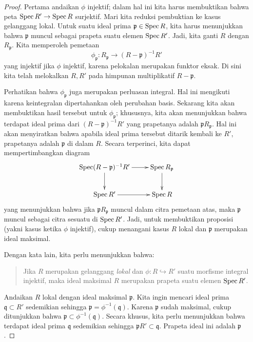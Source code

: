 \begin{proof} Pertama andaikan $\phi$ injektif; dalam hal ini kita harus membuktikan bahwa
peta $\operatorname{Spec} R' \to \operatorname{Spec} R$ surjektif.
Mari kita reduksi pembuktian ke kasus gelanggang lokal.
Untuk suatu ideal prima $\mathfrak{p} \in \operatorname{Spec} R$, kita harus menunjukkan bahwa $\mathfrak{p}$
muncul sebagai prapeta suatu elemen $\operatorname{Spec} R'$.
Jadi, kita ganti $R$ dengan $R_{\mathfrak{p}}$. Kita memperoleh pemetaan
\[ \phi_{\mathfrak{p}}: R_{\mathfrak{p}} \to (R- \mathfrak{p})^{-1} R'  \]
yang injektif jika $\phi$ injektif, karena pelokalan merupakan funktor eksak. Di sini
kita
telah melokalkan $R, R'$ pada himpunan multiplikatif $R - \mathfrak{p}$.

Perhatikan bahwa $\phi_{\mathfrak{p}}$ juga merupakan perluasan integral. Hal ini mengikuti
karena keintegralan dipertahankan oleh perubahan basis.
Sekarang kita akan membuktikan hasil tersebut untuk $\phi_{\mathfrak{p}}$; khususnya, kita
akan menunjukkan
bahwa terdapat ideal prima dari $(R- \mathfrak{p})^{-1} R'$ yang prapetanya adalah
$\mathfrak{p}R_{\mathfrak{p}}$. Hal ini akan menyiratkan bahwa apabila ideal prima tersebut
ditarik kembali ke $R'$, prapetanya adalah $\mathfrak{p}$ di dalam $R$. Secara terperinci, kita
dapat mempertimbangkan diagram
\[ \xymatrix{
\spec (R-\mathfrak{p})^{-1} R'\ar[d]  \ar[r] & \spec R_{\mathfrak{p}} \ar[d] \\
\spec R' \ar[r] &  \spec R
}\]
yang menunjukkan bahwa jika $\mathfrak{p} R_{\mathfrak{p}}$ muncul dalam citra pemetaan atas, maka
$\mathfrak{p}$
muncul sebagai citra sesuatu di $\operatorname{Spec} R'$.
Jadi, untuk membuktikan proposisi (yakni kasus ketika $\phi$
injektif), cukup menangani kasus $R$ lokal dan
$\mathfrak{p}$ merupakan ideal maksimal.


Dengan kata lain, kita perlu menunjukkan bahwa:
\begin{quote}
Jika $R$ merupakan gelanggang \emph{lokal} dan $\phi: R \hookrightarrow R'$ suatu
morfisme integral injektif, maka ideal maksimal $R$ merupakan prapeta
suatu elemen $\operatorname{Spec} R'$.
\end{quote}

Andaikan $R$ lokal dengan ideal maksimal $\mathfrak{p}$. Kita ingin mencari ideal prima $\mathfrak{q} \subset R'$ sedemikian sehingga
$\mathfrak{p}  = \phi^{-1}(\mathfrak{q})$. Karena $\mathfrak{p}$ sudah
maksimal, cukup ditunjukkan bahwa $\mathfrak{p} \subset
\phi^{-1}(\mathfrak{q})$. Secara khusus, kita perlu menunjukkan bahwa terdapat ideal
prima $\mathfrak{q}$ sedemikian sehingga
\( \mathfrak{p} R' \subset \mathfrak{q}.  \)
Prapeta ideal ini adalah $\mathfrak{p}$.


\end{proof}
